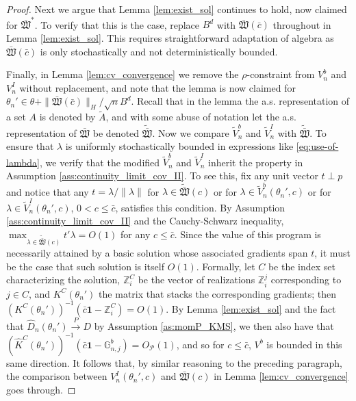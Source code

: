 \documentclass[letterpaper,11pt]{article}
\theoremstyle{myplain}
\theoremstyle{mydefinition}
\theoremstyle{myremark}
\newcommand{\HH}{\mathbb{Z}}
\newcommand{\cP}{\mathcal{P}}
\numberwithin{equation}{section}
\numberwithin{figure}{section}
\begin{document}
\begin{appendices}
\begin{proof}
Next we argue that Lemma \ref{lem:exist_sol} continues to hold, now claimed for $\bar{\mathfrak{W}}^*$. To verify that this is the case, replace $B^d$ with $\bar{\mathfrak{W}}(\bar{c})$ throughout in Lemma \ref{lem:exist_sol}. This requires straightforward adaptation of algebra as $\bar{\mathfrak{W}}(\bar{c})$ is only stochastically and not deterministically bounded.

Finally, in Lemma \ref{lem:cv_convergence} we remove the $\rho$-constraint from $V_n^b$ and $V_n^I$ without replacement, and note that the lemma is now claimed for $\theta_n' \in \theta +\|\bar{\mathfrak{W}}(\bar c)\|_H /\sqrt{n} B^d$. Recall that in the lemma the a.s. representation of a set $A$ is denoted by $\tilde A$, and with some abuse of notation let the a.s. representation of $\bar{\mathfrak{W}}$ be denoted $\widetilde{ \bar{\mathfrak{W}}}$. Now we compare $\tilde V_n^b$ and $\tilde V_n^I$ with $\widetilde{ \bar{\mathfrak{W}}}$. To ensure that $\lambda$ is uniformly stochastically bounded in expressions like \eqref{eq:use-of-lambda}, we verify that the modified $\tilde V_n^b$ and $\tilde V_n^I$ inherit the property in Assumption \ref{ass:continuity_limit_cov_II}.
To see this, fix any unit vector $t \perp p$ and notice that any $t=\lambda /\| \lambda \|$ for $\lambda \in \widetilde{ \bar{\mathfrak{W}}}(c)$ or for $\lambda \in \tilde V_n^b(\theta_n',c)$ or for $\lambda \in \tilde V_n^I(\theta_n',c)$, $0<c\le \bar c$, satisfies this condition. By Assumption \ref{ass:continuity_limit_cov_II} and the Cauchy-Schwarz inequality, $\max_{\lambda \in \widetilde{ \bar{\mathfrak{W}}}(c)}t'\lambda=O(1)$ for any $c \le \bar{c}$. Since the value of this program is necessarily attained by a basic solution whose associated gradients span $t$, it must be the case that such solution is itself $O(1)$. 
Formally, let $C$ be the index set characterizing the solution, $\HH^C_i$ be the vector of realizations $\HH^j_i$ corresponding to $j \in C$, and $K^C(\theta_n')$ the matrix that stacks the corresponding gradients; then $(K^C(\theta_n'))^{-1}(\bar{c}\bm{1}-\HH^C_i)=O(1)$. By Lemma \ref{lem:exist_sol} and the fact that $\hat D_n(\theta_n')\stackrel{P}{\to} D$ by Assumption \ref{as:momP_KMS}, we then also have that $(\hat{K}^C(\theta_n'))^{-1}(\bar{c}\bm{1}-\mathbb{G}^b_{n,j})=O_\cP(1)$, and so for $c \leq \bar{c}$, $V^b$ is bounded in this same direction. It follows that, by similar reasoning to the preceding paragraph, the comparison between $V_n^I(\theta_n',c)$ and $\bar{\mathfrak{W}}(c)$ in Lemma \ref{lem:cv_convergence} goes through.
\end{proof}


\end{appendices}
\end{document}
